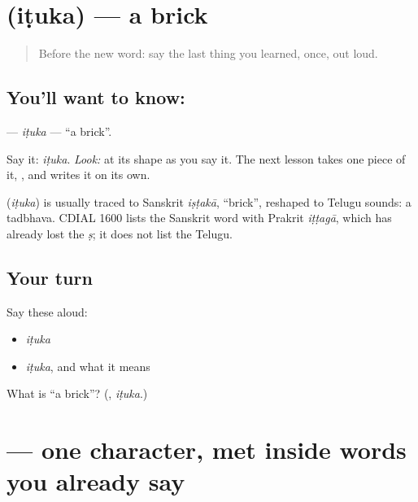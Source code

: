 \section[\texorpdfstring{\te{ఇటుక} (iṭuka)}{ఇటుక (iṭuka)}]{ (iṭuka) — a brick}

\label{lesson:TE-C09-itika}



\begin{quote}
Before the new word: say the last thing you learned, once, out loud.
\end{quote}

\subsection*{You'll want to know: }
\textbf{} — \emph{iṭuka} — \textquotedblleft{}a brick\textquotedblright{}.

Say it: \emph{iṭuka}. \emph{Look:} at its shape as you say it. The next lesson takes one piece of it, \textbf{}, and writes it on its own.

\begin{cousinweb}
\textbf{} (\emph{iṭuka}) is usually traced to Sanskrit \emph{iṣṭakā}, \textquotedblleft{}brick\textquotedblright{}, reshaped to Telugu sounds: a tadbhava. CDIAL 1600 lists the Sanskrit word with Prakrit \emph{iṭṭagā}, which has already lost the \emph{ṣ}; it does not list the Telugu.
\end{cousinweb}

\subsection*{Your turn}
Say these aloud:

\begin{itemize}
\raggedright
  \item \emph{iṭuka}
  \item \emph{iṭuka}, and what it means
\end{itemize}

\begin{tcolorbox}[breakable,colback=teal!4,colframe=teal!35!black,title={Before you move on}]
What is \textquotedblleft{}a brick\textquotedblright{}? (\textbf{}, \emph{iṭuka}.)
\end{tcolorbox}
\section[\texorpdfstring{\te{ఇ} (i)}{ఇ (i)}]{ — one character, met inside words you already say}

